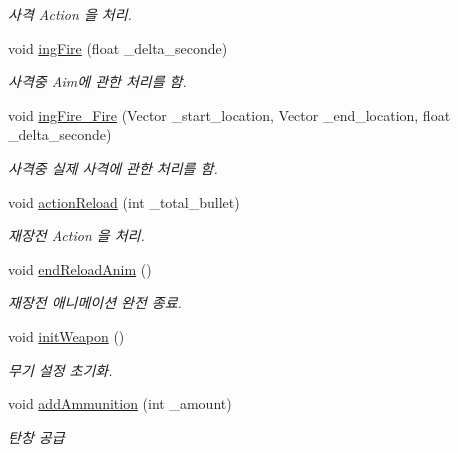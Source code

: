 \begin{DoxyCompactItemize}
\begin{DoxyCompactList}\small\item\em 사격 Action 을 처리. \end{DoxyCompactList}\item 
void \hyperlink{class_person___character_ae24a8beecb67858f956a8d163a4d9333}{ing\+Fire} (float \+\_\+delta\+\_\+seconde)
\begin{DoxyCompactList}\small\item\em 사격중 Aim에 관한 처리를 함. \end{DoxyCompactList}\item 
void \hyperlink{class_person___character_a7d0f5b22056e049f5a46ca0b2abb91ae}{ing\+Fire\+\_\+\+Fire} (Vector \+\_\+start\+\_\+location, Vector \+\_\+end\+\_\+location, float \+\_\+delta\+\_\+seconde)
\begin{DoxyCompactList}\small\item\em 사격중 실제 사격에 관한 처리를 함. \end{DoxyCompactList}\item 
void \hyperlink{class_person___character_a593f0cb97f1f20e42c4ac6642f7dcefe}{action\+Reload} (int \+\_\+total\+\_\+bullet)
\begin{DoxyCompactList}\small\item\em 재장전 Action 을 처리. \end{DoxyCompactList}\item 
void \hyperlink{class_person___character_a5dbcfc49bf5c92294d551a5ead444a80}{end\+Reload\+Anim} ()
\begin{DoxyCompactList}\small\item\em 재장전 애니메이션 완전 종료. \end{DoxyCompactList}\item 
void \hyperlink{class_person___character_adbf33aaddc281c52cc62ab6c59be7b77}{init\+Weapon} ()
\begin{DoxyCompactList}\small\item\em 무기 설정 초기화. \end{DoxyCompactList}\item 
void \hyperlink{class_person___character_ae88a7115ed58c1c240cc463411575351}{add\+Ammunition} (int \+\_\+amount)
\begin{DoxyCompactList}\small\item\em 탄창 공급 \end{DoxyCompactList}\end{DoxyCompactItemize}
